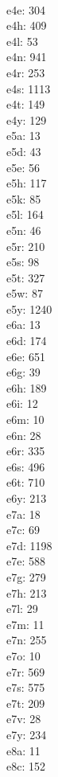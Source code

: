 \begin{multicols}{8}
  \\ e4e: 304
  \\ e4h: 409
  \\ e4l: 53
  \\ e4n: 941
  \\ e4r: 253
  \\ e4s: 1113
  \\ e4t: 149
  \\ e4y: 129
  \\ e5a: 13
  \\ e5d: 43
  \\ e5e: 56
  \\ e5h: 117
  \\ e5k: 85
  \\ e5l: 164
  \\ e5n: 46
  \\ e5r: 210
  \\ e5s: 98
  \\ e5t: 327
  \\ e5w: 87
  \\ e5y: 1240
  \\ e6a: 13
  \\ e6d: 174
  \\ e6e: 651
  \\ e6g: 39
  \\ e6h: 189
  \\ e6i: 12
  \\ e6m: 10
  \\ e6n: 28
  \\ e6r: 335
  \\ e6s: 496
  \\ e6t: 710
  \\ e6y: 213
  \\ e7a: 18
  \\ e7c: 69
  \\ e7d: 1198
  \\ e7e: 588
  \\ e7g: 279
  \\ e7h: 213
  \\ e7l: 29
  \\ e7m: 11
  \\ e7n: 255
  \\ e7o: 10
  \\ e7r: 569
  \\ e7s: 575
  \\ e7t: 209
  \\ e7v: 28
  \\ e7y: 234
  \\ e8a: 11
  \\ e8c: 152

\end{multicols}
